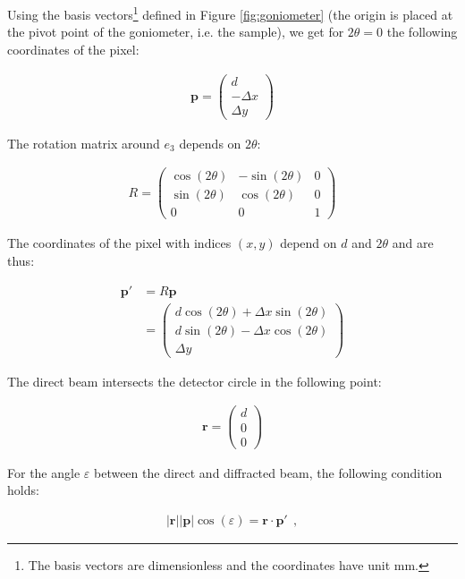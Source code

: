 \documentclass[a4paper, 12pt, twoside]{scrartcl}
\begin{document}
Using the basis vectors\footnote{The basis vectors are dimensionless and the coordinates have unit $ \mathrm{mm} $.} defined in Figure \ref{fig:goniometer} (the origin is placed at the pivot point of the goniometer, i.e. the sample), we get for $ 2\theta = 0 $ the following coordinates of the pixel:

\begin{align*}
  \boldsymbol{p} = \begin{pmatrix} d \\ -\Delta x \\ \Delta y \end{pmatrix}	
\end{align*}

The rotation matrix around $ e_3 $ depends on $ 2\theta $:

\begin{align*}
	R = \begin{pmatrix}
		    \cos(2\theta) & -\sin(2\theta) & 0 \\
		    \sin(2\theta) & \cos(2\theta)  & 0 \\
		    0 & 0 & 1
		\end{pmatrix}
\end{align*}

The coordinates of the pixel with indices $ (x, y) $ depend on $ d $ and $ 2\theta $ and are thus:

\begin{align*}
	\boldsymbol{p'} &= R \boldsymbol{p} \\
	 &=
	\begin{pmatrix}
	d \cos(2\theta) + \Delta x \sin(2\theta) \\
	d \sin(2\theta) - \Delta x \cos(2\theta) \\
	\Delta y
	\end{pmatrix}
\end{align*}

The direct beam intersects the detector circle in the following point:

\begin{align*}
	\boldsymbol{r} = \begin{pmatrix} d \\ 0 \\ 0 \end{pmatrix}
\end{align*}

For the angle $ \varepsilon $ between the direct and diffracted beam, the following condition holds:

\begin{align*}
	|\boldsymbol{r}| |\boldsymbol{p}| \cos(\varepsilon) = \boldsymbol{r} \cdot \boldsymbol{p'}~~\mathrm{,}
\end{align*}
\end{document}
